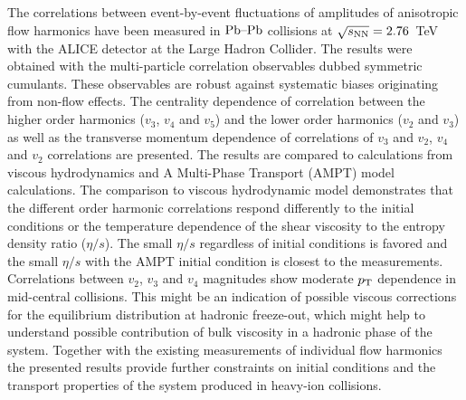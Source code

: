 The correlations between event-by-event fluctuations of amplitudes of anisotropic flow harmonics 
have been measured in $\textnormal{Pb--Pb}$ collisions at $\sqrt{s_{\textnormal{NN}}}=2.76$~TeV with the ALICE detector at the Large Hadron Collider. 
The results were obtained with the multi-particle correlation observables dubbed symmetric cumulants.
These observables are robust against systematic biases originating from non-flow effects. 
The centrality dependence of correlation between the higher order harmonics ($v_3$, $v_4$ and $v_5$) and the lower order harmonics ($v_2$ and $v_3$) as well as the transverse momentum dependence of correlations of $v_3$ and $v_2$, $v_4$ and $v_2$ correlations are presented. 
The results are compared to calculations from viscous hydrodynamics and  A Multi-Phase Transport ({AMPT}) model calculations.
The comparison to viscous hydrodynamic model demonstrates that
the different order harmonic correlations respond differently to the initial conditions or the temperature dependence of the shear viscosity to the entropy density ratio ($\eta/s$). The small $\eta/s$ regardless of initial conditions is favored and the small $\eta/s$ with the AMPT initial condition is closest to the measurements. 
Correlations between $v_2$, $v_3$ and $v_4$ magnitudes show moderate $p_{\rm T}$ dependence in mid-central collisions. This might be an indication of possible viscous corrections for the equilibrium distribution at hadronic freeze-out, which might help to understand possible contribution of bulk viscosity in a hadronic phase of the system.
Together with the existing measurements of individual flow harmonics the presented results provide further constraints 
on initial conditions and the transport properties of the system produced in heavy-ion collisions.
